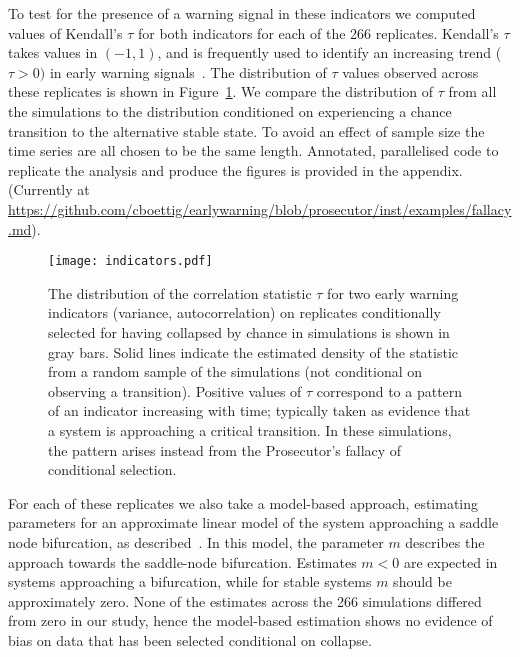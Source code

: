 \documentclass[authoryear,5p]{elsarticle}
\begin{document}
To test for the presence of a warning signal in these indicators we
computed values of Kendall's $\tau$ for both indicators for each of
the 266 replicates.  Kendall's $\tau$ takes values in $(-1, 1)$, and is
frequently used to identify an increasing trend ($\tau > 0 )$ in early
warning signals~\citep{Dakos2008, Dakos2011}.  The distribution
of $\tau$ values observed across these replicates is shown in
Figure~\ref{fig:indicator}.   
We compare the distribution of $\tau$ from all the simulations to
the distribution conditioned on experiencing a chance transition to the
alternative stable state.  To avoid an effect of sample size the time series are all chosen
to be the same length.  
Annotated, parallelised code to replicate the analysis
and produce the figures is provided in the appendix.  (Currently at
\href{https://github.com/cboettig/earlywarning/blob/prosecutor/inst/examples/fallacy.md}{https://github.com/cboettig/earlywarning/blob/prosecutor/inst/examples/fallacy.md}).


\begin{figure}
  \begin{center}
    \texttt{[image: indicators.pdf]}
  \end{center}
  \caption{The distribution of the correlation statistic $\tau$ for two
  early warning indicators (variance, autocorrelation) on replicates
  conditionally selected for having collapsed by chance in simulations
  is shown in gray bars.  Solid lines indicate the estimated density of
  the statistic from a random sample of the simulations (not conditional
  on observing a transition). Positive values of $\tau$ correspond to
  a pattern of an indicator increasing with time; typically taken as
  evidence that a system is approaching a critical transition.  In these
  simulations, the pattern arises instead from the Prosecutor's fallacy
  of conditional selection.}
  \label{fig:indicator}
\end{figure}


For each of these replicates we also take a model-based
approach, estimating parameters for an approximate linear
model of the system approaching a saddle node bifurcation, as
described~\citet{Boettiger2012b}.  In this model, the parameter $m$
describes the approach towards the saddle-node bifurcation.  Estimates
$m < 0 $ are expected in systems approaching a bifurcation, while for
stable systems $m$ should be approximately zero. None of the estimates
across the 266 simulations differed from zero in our study, hence the
model-based estimation shows no evidence of bias on data that has been
selected conditional on collapse.
\end{document}
